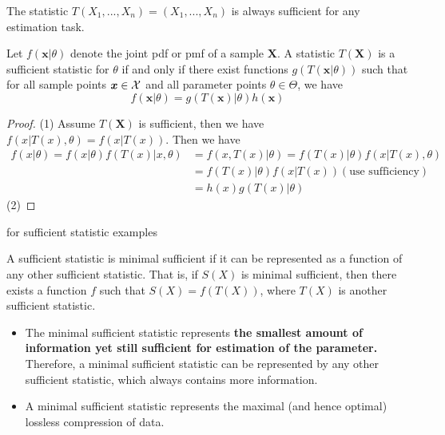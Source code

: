 \begin{refsection}
\begin{remark}
	The statistic $T(X_1,...,X_n)=(X_1,...,X_n)$ is always sufficient for any estimation task.
\end{remark}


\begin{theorem}
	\cite[276]{casella2002statistical} Let $f(\bm{x}|\theta)$ denote the joint pdf or pmf of a sample $\bm{X}$. A statistic $T(\bm{X})$ is a sufficient statistic for $\theta$ if and only if there exist functions $g(T(\bm{x}|\theta))$ such that for all sample points $\bm{x}\in \mathcal{X}$ and all parameter points $\theta \in\Theta$, we have
	$$f(\bm{x}|\theta) = g(T(\bm{x})|\theta)h(\bm{x})$$
\end{theorem}
\begin{proof}
	(1) Assume $T(\bm{X})$ is sufficient, then we have $f(x|T(x),\theta) = f(x|T(x))$. Then we have
	\begin{align*}
	f(x|\theta) = f(x|\theta) f(T(x)|x,\theta) &= f(x,T(x)|\theta) = f(T(x)|\theta) f(x|T(x),\theta)\\
	&= f(T(x)|\theta)f(x|T(x)) (\text{use sufficiency})\\
	&=h(x) g(T(x)|\theta)
	\end{align*}
	(2)	
	
	
\end{proof}

\cite[451]{moon2000mathematical} for sufficient statistic examples







\begin{definition}\cite[48]{keener2010theoretical}
	A sufficient statistic is minimal sufficient if it can be represented as a function of any other sufficient statistic. That is, if $S(X)$ is minimal sufficient, then there exists a function $f$ such that $S(X) = f(T(X))$, where $T(X)$ is another sufficient statistic.
\end{definition}




\begin{remark}\hfill
	\begin{itemize}
		\item The minimal sufficient statistic represents \textbf{the smallest amount of information yet still sufficient for estimation of the parameter.} Therefore, a minimal sufficient statistic can be represented by any other sufficient statistic, which always contains more information.
		\item A minimal sufficient statistic represents the maximal (and hence optimal) lossless compression of data.
	\end{itemize}
\end{remark}


\end{refsection}
